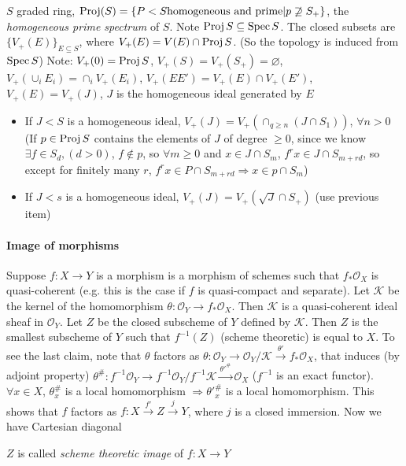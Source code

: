 \documentclass[main]{subfiles}
\begin{document}
\begin{definition}
$S$ graded ring, $\operatorname{Proj}(S)=\{P<S \text{homogeneous and prime}|p\not\supseteq S_+\}$, the \textit{homogeneous prime spectrum} of $S$. Note $\operatorname{Proj} S\subseteq\operatorname{Spec} S$. The closed subsets are $\{V_+(E)\}_{E\subseteq S}$, where $V_+(E)=V(E)\cap\operatorname{Proj} S$. (So the topology is induced from $\operatorname{Spec} S$) Note: $V_+(0)=\operatorname{Proj} S$, $V_+(S)=V_+(S_+)=\varnothing$, $V_+(\cup_iE_i)=\cap_iV_+(E_i)$, $V_+(EE')=V_+(E)\cap V_+(E')$, $V_+(E)=V_+(J)$, $J$ is the homogeneous ideal generated by $E$
\end{definition}

\begin{itemize}
\item If $J<S$ is a homogeneous ideal, $V_+(J)=V_+(\cap_{q\geq n}(J\cap S_1))$, $\forall n>0$ (If $p\in\operatorname{Proj} S$ contains the elements of $J$ of degree $\geq 0$, since we know $\exists f\in S_d,(d>0)$, $f\notin p$, so $\forall m\geq0$ and $x\in J\cap S_m$, $f^rx\in J\cap S_{m+rd}$, so except for finitely many $r$, $f^rx\in P\cap S_{m+rd}\Rightarrow x\in p\cap S_m$)
\item If $J<s$ is a homogeneous ideal, $V_+(J)=V_+(\sqrt{J}\cap S_+)$ (use previous item)
\end{itemize}

\paragraph{Image of morphisms} Suppose $f:X\to Y$ is a morphism is a morphism of schemes such that $f_*\mathcal O_X$ is quasi-coherent (e.g. this is the case if $f$ is quasi-compact and separate). Let $\mathcal K$ be the kernel of the homomorphism $\theta:\mathcal O_Y\to f_*\mathcal O_X$. Then $\mathcal K$ is a quasi-coherent ideal sheaf in $\mathcal O_Y$. Let $Z$ be the closed subscheme of $Y$ defined by $\mathcal K$. Then $Z$ is the smallest subscheme of $Y$ such that $f^{-1}(Z)$ (scheme theoretic) is equal to $X$. To see the last claim, note that $\theta$ factors as $\theta:\mathcal O_Y\to\mathcal O_Y/\mathcal K\xrightarrow{\theta'}f_*\mathcal O_X$, that induces (by adjoint property) $\theta^\#:f^{-1}\mathcal O_Y\to f^{-1}\mathcal O_Y/f^{-1}\mathcal K\xrightarrow{\theta'^\#}\mathcal O_X$ ($f^{-1}$ is an exact functor). $\forall x\in X$, $\theta_x^\#$ is a local homomorphism $\Rightarrow\theta'^\#_x$ is a local homomorphism. This shows that $f$ factors as $f:X\xrightarrow{f'}Z\xrightarrow{j}Y$, where $j$ is a closed immersion. Now we have Cartesian diagonal

\begin{definition}
$Z$ is called \textit{scheme theoretic image} of $f:X\to Y$
\end{definition}
\end{document}
